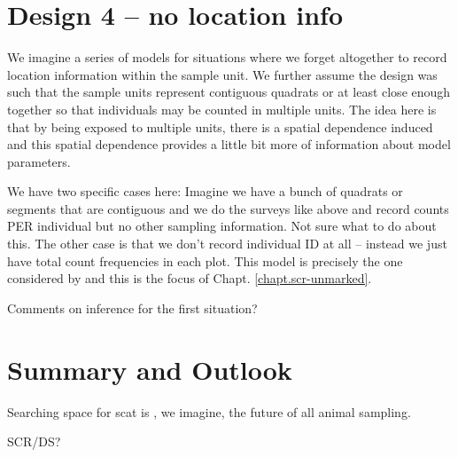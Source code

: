 \section{Design 4 -- no location info }

We imagine a series of models for situations where we forget
altogether to record location information within the sample unit. We
further assume the design was such that the sample units represent
contiguous quadrats or at least close enough together so that
individuals may be counted in multiple units. The idea here is that by
being exposed to multiple units, there is a spatial dependence induced
and this spatial dependence provides a little bit more of information
about model parameters. 

We have two specific cases here:
Imagine we have a bunch of quadrats or segments that are contiguous
and we do the surveys like above and record counts PER individual  but
no other sampling information.  Not sure what to do about this.
The other case is that we don't record individual ID at all -- instead
we just have total count frequencies in each plot. 
This model is precisely the one considered by
\citep{chandler_royle:2012} and this is the focus of Chapt. \ref{chapt.scr-unmarked}.

Comments on inference for the first situation?




\section{Summary and Outlook}


Searching space for scat is , we imagine, the future of all animal
sampling. 


SCR/DS?